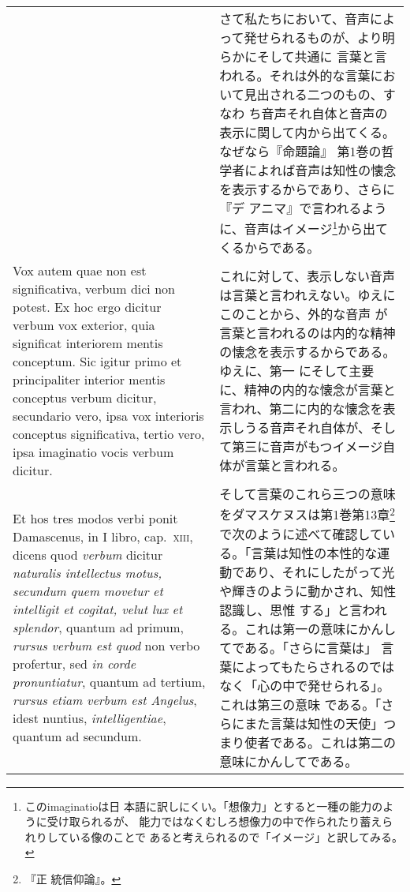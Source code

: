 \documentclass[10pt]{jsarticle} %
\begin{document}
\begin{longtable}{p{21em}p{21em}}
&

さて私たちにおいて、音声によって発せられるものが、より明らかにそして共通に
 言葉と言われる。それは外的な言葉において見出される二つのもの、すなわ
 ち音声それ自体と音声の表示に関して内から出てくる。なぜなら『命題論』
 第1巻の哲学者によれば音声は知性の懐念を表示するからであり、さらに『デ
 アニマ』で言われるように、音声はイメージ\footnote{このimaginatioは日
 本語に訳しにくい。「想像力」とすると一種の能力のように受け取られるが、
 能力ではなくむしろ想像力の中で作られたり蓄えられりしている像のことで
 あると考えられるので「イメージ」と訳してみる。}から出てくるからである。


\\



Vox autem quae non est significativa, verbum dici non
 potest. Ex hoc ergo dicitur verbum vox exterior, quia significat
 interiorem mentis conceptum. Sic igitur primo et principaliter
 interior mentis conceptus verbum dicitur, secundario vero, ipsa vox
 interioris conceptus significativa, tertio vero, ipsa imaginatio
 vocis verbum dicitur. 

&

これに対して、表示しない音声は言葉と言われえない。ゆえにこのことから、外的な音声
が言葉と言われるのは内的な精神の懐念を表示するからである。ゆえに、第一
 にそして主要に、精神の内的な懐念が言葉と言われ、第二に内的な懐念を表
 示しうる音声それ自体が、そして第三に音声がもつイメージ自体が言葉と言われる。


\\


Et hos tres modos verbi ponit Damascenus, in I
 libro, cap.~{\scshape xiii}, dicens quod {\itshape verbum} dicitur
 {\itshape naturalis intellectus motus, secundum quem movetur et intelligit et cogitat, velut lux et
 splendor}, quantum ad primum, {\itshape rursus verbum est quod} non verbo
 profertur, sed {\itshape in corde pronuntiatur}, quantum ad tertium, {\itshape rursus
 etiam verbum est Angelus}, idest nuntius, {\itshape intelligentiae}, quantum ad
 secundum. 

&

そして言葉のこれら三つの意味をダマスケヌスは第1巻第13章\footnote{『正
 統信仰論』。}で次のように述べて確認している。「言葉は知性の本性的な運
 動であり、それにしたがって光や輝きのように動かされ、知性認識し、思惟
 する」と言われる。これは第一の意味にかんしてである。「さらに言葉は」
 言葉によってもたらされるのではなく「心の中で発せられる」。これは第三の意味
 である。「さらにまた言葉は知性の天使」つまり使者である。これは第二の
 意味にかんしてである。



\end{longtable}
\end{document}
